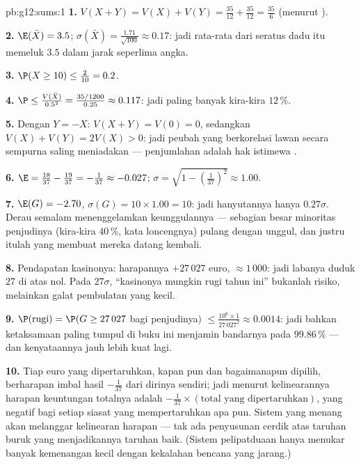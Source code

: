 \begin{solution}{pb:g12:sums:1}
\textbf{1.} $V(X + Y) = V(X) + V(Y) = \frac{35}{12} +
\frac{35}{12} = \frac{35}{6}$ (menurut ).

\textbf{2.} $\E(\bar X) = 3.5$;
$\sigma(\bar X) = \frac{1.71}{\sqrt{100}} \approx 0.17$: jadi
rata-rata dari seratus dadu itu memeluk $3.5$ dalam jarak seperlima angka.

\textbf{3.} $\P(X \geq 10) \leq \frac{2}{10} = 0.2$.

\textbf{4.} $\P \leq \frac{V(\bar X)}{0.5^2} =
\frac{35/1200}{0.25} \approx 0.117$: jadi paling banyak kira-kira
$12\,\%$.

\textbf{5.} Dengan $Y = -X$: $V(X + Y) = V(0) = 0$, sedangkan
$V(X) + V(Y) = 2V(X) > 0$: jadi peubah yang berkorelasi lawan secara sempurna
saling meniadakan --- penjumlahan  adalah hak istimewa .

\textbf{6.} $\E = \frac{18}{37} - \frac{19}{37} =
-\frac{1}{37} \approx -0.027$;
$\sigma = \sqrt{1 - \left(\frac{1}{37}\right)^2} \approx
1.00$.

\textbf{7.} $\E(G) = -2.70$, $\sigma(G) = 10 \times 1.00 =
10$: jadi hanyutannya hanya $0.27\sigma$. Derau semalam menenggelamkan
keunggulannya --- sebagian besar minoritas penjudinya (kira-kira $40\,\%$,
kata loncengnya) pulang dengan unggul, dan justru itulah yang membuat
mereka datang kembali.

\textbf{8.} Pendapatan kasinonya: harapannya $+27\,027$ euro,
 $\approx 1\,000$: jadi labanya duduk $27$
 di atas nol. Pada $27\sigma$, ``kasinonya
mungkin rugi tahun ini'' bukanlah risiko, melainkan galat pembulatan yang kecil.

\textbf{9.} $\P(\text{rugi}) = \P(G \geq 27\,027$ bagi
penjudinya$)$ $\leq \frac{10^6 \times 1}{27\,027^2} \approx
0.0014$: jadi bahkan ketaksamaan paling tumpul di buku ini menjamin
bandarnya pada $99.86\,\%$ --- dan kenyataannya jauh lebih
kuat lagi.

\textbf{10.} Tiap euro yang dipertaruhkan, kapan pun dan bagaimanapun dipilih,
berharapan imbal hasil $-\frac{1}{37}$ dari dirinya sendiri; jadi menurut kelinearannya
harapan keuntungan totalnya adalah $-\frac{1}{37} \times
(\text{total yang dipertaruhkan})$, yang negatif bagi setiap siasat yang
mempertaruhkan apa pun. Sistem yang menang akan melanggar kelinearan
harapan --- tak ada penyusunan cerdik atas taruhan buruk yang menjadikannya
taruhan baik. (Sistem pelipatduaan hanya menukar banyak kemenangan kecil dengan
kekalahan bencana yang jarang.)


\end{solution}
